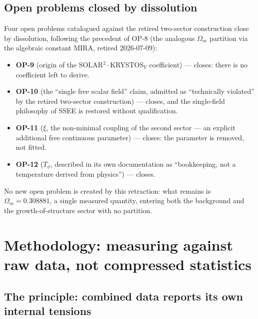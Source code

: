 \documentclass[12pt,a4paper]{article}
\newcommand{\SSEE}{\textsc{SSEE}}
\begin{document}
\subsection{Open problems closed by dissolution}

Four open problems catalogued against the retired two-sector construction close by
dissolution, following the precedent of OP-8 (the analogous $\Omega_m$
partition via the algebraic constant MIRA, retired 2026-07-09):

\begin{itemize}
  \item \textbf{OP-9} (origin of the SOLAR$^2\cdot$KRYSTOS$_V$ coefficient) ---
        closes: there is no coefficient left to derive.
  \item \textbf{OP-10} (the ``single free scalar field'' claim, admitted as
        ``technically violated'' by the retired two-sector construction) --- closes,
        and the single-field philosophy of \SSEE{} is restored without
        qualification.
  \item \textbf{OP-11} ($\xi$, the non-minimal coupling of the second sector
        --- an explicit additional free continuous parameter) --- closes: the
        parameter is removed, not fitted.
  \item \textbf{OP-12} ($T_\phi$, described in its own documentation as
        ``bookkeeping, not a temperature derived from physics'') --- closes.
\end{itemize}

No new open problem is created by this retraction: what remains is
$\Omega_m=0.308881$, a single measured quantity, entering both the background
and the growth-of-structure sector with no partition.

\section{Methodology: measuring against raw data, not compressed statistics}
\label{sec:method}

\subsection{The principle: combined data reports its own internal tensions}
\end{document}

